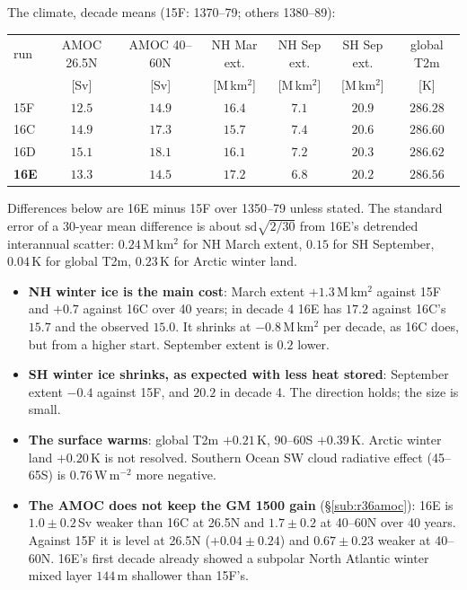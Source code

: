 \documentclass[10pt]{article}
\begin{document}
\noindent The climate, decade means (15F: 1370--79; others 1380--89):

\begin{center}\small
\begin{tabular}{lcccccc}
\toprule
run & AMOC 26.5N & AMOC 40--60N & NH Mar ext. & NH Sep ext. & SH Sep ext. & global T2m \\
 & [Sv] & [Sv] & [M\,km$^2$] & [M\,km$^2$] & [M\,km$^2$] & [K] \\
\midrule
15F & $12.5$ & $14.9$ & $16.4$ & $7.1$ & $20.9$ & $286.28$ \\
16C & $14.9$ & $17.3$ & $15.7$ & $7.4$ & $20.6$ & $286.60$ \\
16D & $15.1$ & $18.1$ & $16.1$ & $7.2$ & $20.3$ & $286.62$ \\
\textbf{16E} & $13.3$ & $14.5$ & $17.2$ & $6.8$ & $20.2$ & $286.56$ \\
\bottomrule
\end{tabular}
\end{center}

\noindent Differences below are 16E minus 15F over 1350--79 unless stated. The standard error of
a 30-year mean difference is about $\mathrm{sd}\sqrt{2/30}$ from 16E's detrended interannual
scatter: $0.24$\,M\,km$^2$ for NH March extent, $0.15$ for SH September, $0.04$\,K for global
T2m, $0.23$\,K for Arctic winter land.
\begin{itemize}\itemsep2pt
\item \textbf{NH winter ice is the main cost}: March extent $+1.3$\,M\,km$^2$ against 15F and
$+0.7$ against 16C over 40 years; in decade 4 16E has $17.2$ against 16C's $15.7$ and the observed
$15.0$. It shrinks at $-0.8$\,M\,km$^2$ per decade, as 16C does, but from a higher start.
September extent is $0.2$ lower.
\item \textbf{SH winter ice shrinks, as expected with less heat stored}: September extent
$-0.4$ against 15F, and $20.2$ in decade 4. The direction holds; the size is small.
\item \textbf{The surface warms}: global T2m $+0.21$\,K, 90--60S $+0.39$\,K. Arctic winter land
$+0.20$\,K is not resolved. Southern Ocean SW cloud radiative effect (45--65S) is
$0.76$\,W\,m$^{-2}$ more negative.
\item \textbf{The AMOC does not keep the GM 1500 gain} (\S\ref{sub:r36amoc}): 16E is
$1.0\pm0.2$\,Sv weaker than 16C at 26.5N and $1.7\pm0.2$ at 40--60N over 40 years. Against 15F
it is level at 26.5N ($+0.04\pm0.24$) and $0.67\pm0.23$ weaker at 40--60N. 16E's first decade
already showed a subpolar North Atlantic winter mixed layer $144$\,m shallower than 15F's.
\end{itemize}
\end{document}
